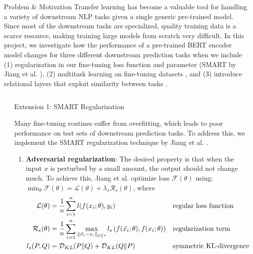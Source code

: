 \documentclass[final]{beamer}
\newlength{\sepwidth}
\newlength{\colwidth}
\newcommand{\separatorcolumn}{\begin{column}{\sepwidth}\end{column}}
\begin{document}
\begin{frame}[t]
\vfill
\begin{block}{\large Problem \& Motivation}
  Transfer learning has become a valuable tool for handling a variety of downstream NLP tasks given a single generic pre-trained model. Since most of the downstream tasks are specialized, quality training data is a scarce resource, making training large models from scratch very difficult. 
  In this project, we investigate how the performance of a pre-trained BERT encoder model changes for three different downstream prediction tasks when we include (1) regularization in our fine-tuning loss function and parameter (SMART by Jiang et al. \cite{smart}), (2) multitask learning on fine-tuning datasets \cite{MTL}, and (3) introduce relational layers that exploit similarity between tasks \cite{MTL}.
  

\end{block}

\begin{columns}[t]
\separatorcolumn

\begin{column}{\colwidth}

  \begin{block}{Extension 1: SMART Regularization}
            
Many fine-tuning routines suffer from overfitting, which leads to poor performance on test sets of downstream prediction tasks. To address this, we implement the SMART regularization technique by Jiang et al. \cite{smart}.

\begin{enumerate}
    \item \textbf{Adversarial regularization}: The desired property is that when the input $x$ is perturbed by a small amount, the output should not change much. To achieve this, Jiang et al. \cite{smart} optimize loss $\mathcal{F}(\theta)$ using: $\min_{\theta} \mathcal{F}(\theta) = \mathcal{L}(\theta) + \lambda_{s}\mathcal{R}_{s}(\theta)$, where
    \begin{align*}
    \mathcal{L}(\theta) & = \frac{1}{n} \sum_{i=1}^{n} l(f(x_{i};\theta), y_{i}) && \text{regular loss function} \\
    \mathcal{R}_{s}(\theta) & = \frac{1}{n} \sum_{i=1}^{n} \max_{\lVert \Tilde{x_{i}} - x_{i} \rVert_{p \leq \epsilon}} l_{s}\left(f(\Tilde{x_{i}}; \theta), f(x_{i}; \theta)\right) && \text{regularization term}\\
    l_{s}(P, Q) & = \mathcal{D}_{KL}(P \lVert Q) + \mathcal{D}_{KL}(Q \lVert P) && \text{symmetric KL-divergence}
    \end{align*} 


\end{enumerate}
\end{block}
\end{column}
\end{columns}
\end{frame}
\end{document}
